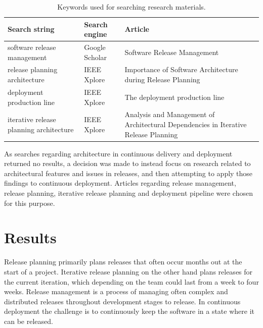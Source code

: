 \documentclass[conference]{IEEEtran}
\begin{document}
\begin{center}
\begin{table}
    \caption{Keywords used for searching research materials.}
    \begin{tabular}{ | p{2cm} | p{2cm} | p{3.5cm} |}
    \hline
    Search string & Search engine & Article \\ \hline
    software release management & Google Scholar & Software Release Management \\ \hline
	release planning architecture & IEEE Xplore & Importance of Software Architecture during Release Planning \\ \hline
	deployment production line & IEEE Xplore & The deployment production line \\ \hline
	iterative release planning architecture & IEEE Xplore & Analysis and Management of Architectural Dependencies in Iterative Release Planning \\ \hline
    \end{tabular}
    \end{table}
\end{center}

As searches regarding architecture in continuous delivery and deployment returned no results, a decision was made to instead focus on research related to architectural features and issues in releases, and then attempting to apply those findings to continuous deployment. Articles regarding release management, release planning, iterative release planning and deployment pipeline were chosen for this purpose.


\section{Results} %
Release planning primarily plans releases that often occur months out at the start of a project. Iterative release planning on the other hand plans releases for the current iteration, which depending on the team could last from a week to four weeks. Release management is a process of managing often complex and distributed releases throughout development stages to release. In continuous deployment the challenge is to continuously keep the software in a state where it can be released. 
\end{document}
